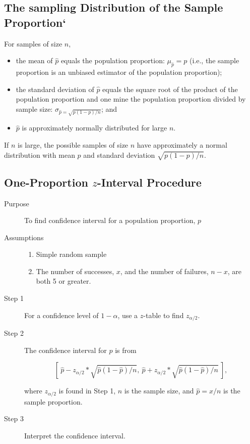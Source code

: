\documentclass[12pt]{article}
\begin{document}
        \subsection*{The sampling Distribution of the Sample Proportion`}
            For samples of size $n$,
            \begin{itemize}
                \item the mean of $\hat{p}$ equals the population proportion: $\mu_{\hat{p}}
                = p$ (i.e., the sample proportion is an unbiased estimator of the population
                proportion);
                \item the standard deviation of $\hat{p}$ equals the square root of the
                product of the population proportion and one mine the population proportion
                divided by sample size: $\sigma_{\hat{p} = \sqrt{p(1-p)/n}}$; and
                \item $\hat{p}$ is approximately normally distributed for large $n$.
            \end{itemize}
            If $n$ is large, the possible samples of size $n$ have approximately a normal
            distribution with mean $p$ and standard deviation $\sqrt{p(1-p)/n}$.
        \subsection{One-Proportion $z$-Interval Procedure}
            \begin{description}
                \item[Purpose] To find confidence interval for a population proportion, $p$
                \item[Assumptions] 
                \begin{enumerate}
                    \item Simple random sample
                    \item The number of successes, $x$, and the number of failures, $n-x$,
                    are both 5 or greater.                    
                \end{enumerate}
                \item[Step 1] For a confidence level of $1-\alpha$, use a $z$-table to find
                $z_{\alpha/2}$.
                \item[Step 2] The confidence interval for $p$ is from 
                \begin{center}
                    \[
                        [ \
                            \hat{p}-z_{\alpha/2}*\sqrt{\hat{p}(1-\hat{p})/n} 
                            , \
                            \hat{p}+z_{\alpha/2}*\sqrt{\hat{p}(1-\hat{p})/n}
                        \ ],
                    \]
                \end{center}
                where $z_{\alpha/2}$ is found in Step 1, $n$ is the sample size, and 
                $\hat{p}=x/n$ is the sample proportion. 
                \item[Step 3] Interpret the confidence interval.
            \end{description}
\end{document}
